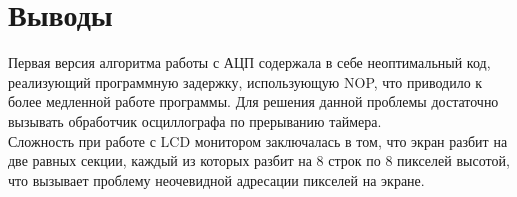 \documentclass[14pt,a4paper,report]{report}
\begin{document}
\clearpage
\section{Выводы}
Первая версия алгоритма работы с АЦП содержала в себе неоптимальный код, реализующий программную задержку, использующую NOP, что приводило к более медленной работе программы. Для решения данной проблемы достаточно вызывать обработчик осциллографа по прерыванию таймера.\\
\indent Сложность при работе с LCD монитором заключалась в том, что экран разбит на две равных секции, каждый из которых разбит на 8 строк по 8 пикселей высотой, что вызывает проблему неочевидной адресации пикселей на экране.  \\
\end{document}
